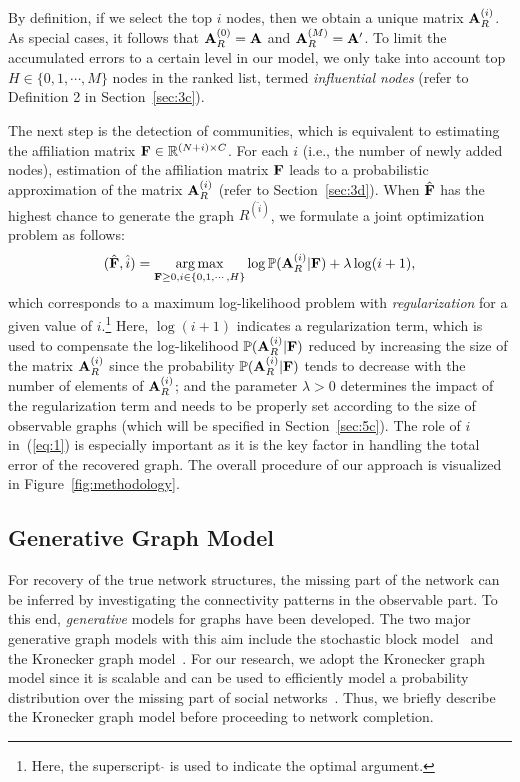 \documentclass[format=acmsmall, review=false, screen=true]{acmart}
\def \log{\operatorname{log}}
\newcommand{\argmax}{\mathop{\mathrm{arg\,max}}}
\begin{document}
By definition, if we select the top $i$ nodes, then we obtain a unique matrix ${\bf A}_R^{(i)}$. As special cases, it follows that ${\bf A}_R^{(0)} = {\bf A}$ and ${\bf A}_R^{(M)} = {\bf A}'$. To limit the accumulated errors to a certain level in our model, we only take into account top $H\in\{0,1,\cdots,M\}$ nodes in the ranked list, termed {\em influential nodes} (refer to Definition 2 in Section~\ref{sec:3c}).

The next step is the detection of communities, which is equivalent to estimating the affiliation matrix ${\bf F}\in \mathbb{R}^{(N+i)\times C}$. For each $i$ (i.e., the number of newly added nodes), estimation of the affiliation matrix ${\bf F}$ leads to a probabilistic approximation of the matrix ${\bf A}_R^{(i)}$ (refer to Section~\ref{sec:3d}). When $\hat{{\bf F}}$ has the highest chance to generate the graph $R^{(\hat{i})}$, we formulate a joint optimization problem as follows:
\begin{equation}\label{eq:1}
(\hat{{\bf F}}, \hat{i})=\argmax_{{\bf F} \geq 0, i \in\{0,1,\cdots,H\} } \log\mathbb{P}({\bf A}_R^{(i)}|{\bf F} ) + \lambda\log(i+1),
\end{equation}
which corresponds to a maximum log-likelihood problem with {\em regularization} for a given value of $i$.\footnote{Here, the superscript $\hat{}$ is used to indicate the optimal argument.} Here, $\log(i+1)$ indicates a regularization term, which is used to compensate the log-likelihood $\mathbb{P}({\bf A}_R^{(i)}|{\bf F} )$ reduced by increasing the size of the matrix ${\bf A}_R^{(i)}$ since the probability $\mathbb{P}({\bf A}_R^{(i)}|{\bf F})$ tends to decrease with the number of elements of ${\bf A}_R^{(i)}$; and the parameter $\lambda>0$ determines the impact of the regularization term and needs to be properly set according to the size of observable graphs (which will be specified in Section~\ref{sec:5c}). The role of $i$ in~(\ref{eq:1}) is especially important as it is the key factor in handling the total error of the recovered graph. 
The overall procedure of our approach is visualized in Figure~\ref{fig:methodology}.

\subsection{Generative Graph Model}\label{sec:3b}
For recovery of the true network structures, the missing part of the network can be inferred by investigating the connectivity patterns in the observable part. To this end, {\em generative} models for graphs have been developed. The two major generative graph models with this aim include the stochastic block model~\cite{sbm} and the Kronecker graph model~\cite{kronmodel}. For our research, we adopt the Kronecker graph model since it is scalable and can be used to efficiently model a probability distribution over the missing part of social networks~\cite{kronmodel}. Thus, we briefly describe the Kronecker graph model before proceeding to network completion.
\end{document}

